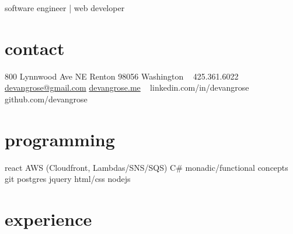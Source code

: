 \documentclass[]{friggeri-cv}
\begin{document}
       { software engineer | web developer }




\begin{aside}
  \section{contact}
    800 Lynnwood Ave NE
    Renton 98056
    Washington
    ~
    425.361.6022
    \href{mailto:devangrose@gmail.com}{devangrose@gmail.com}
    \href{http://devangrose.me}{devangrose.me}
    ~
    linkedin.com/in/devangrose
    github.com/devangrose
  \section{programming}
    react
    AWS (Cloudfront, Lambdas/SNS/SQS)
    C\#
    monadic/functional concepts
    git
    postgres
    jquery
    html/css
    nodejs

\end{aside}

\section{experience}
\end{document}
